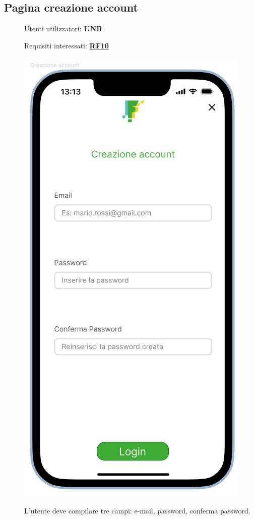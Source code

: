\documentclass{article}
\begin{document}
\subsection{Pagina creazione account}
\begin{description}
    \item[] Utenti utilizzatori: \textbf{UNR}
    \item[] Requisiti interessati: \hyperref[rf_10]{\textbf{RF10}}
    \item[] \begin{center}
              \includegraphics[scale=0.6]{Crea_Account.png}
          \end{center}
    \item[] L'utente deve compilare tre campi: e-mail, password, conferma password.
\end{description}
\clearpage
\end{document}
